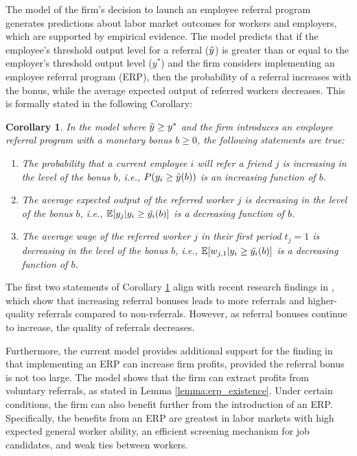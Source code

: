 \documentclass[12pt]{article}
\newtheorem{corollary}[theorem]{Corollary}
\begin{document}
The model of the firm's decision to launch an employee referral program generates predictions about labor market outcomes for workers and employers, which are supported by empirical evidence. The model predicts that if the employee's threshold output level for a referral ($\Tilde{y}$) is greater than or equal to the employer's threshold output level ($y^*$) and the firm considers implementing an employee referral program (ERP),  then the probability of a referral increases with the bonus, while the average expected output of referred workers decreases. This is formally stated in the following Corollary:

\begin{corollary}\label{cor:erp_emp_evidence}
In the model where $\Tilde{y} \geq y^*$ and the firm introduces an employee referral program with a monetary bonus $b \geq 0$, the following statements are true:
\begin{enumerate}[label = {\roman*)}]
\item The probability that a current employee $i$ will refer a friend $j$ is increasing in the level of the bonus $b$, i.e., $P(y_i\geq \Tilde{y}(b))$ is an increasing function of $b$.
\item The average expected output of the referred worker $j$ is decreasing in the level of the bonus $b$, i.e., $\mathbb{E}[y_j|y_i\geq \Tilde{y_i}(b)]$ is a decreasing function of $b$.
\item The average wage of the referred worker $j$ in their first period $t_j = 1$ is decreasing in the level of the bonus $b$, i.e., $\mathbb{E}[w_{j,1}|y_i\geq \Tilde{y_i}(b)]$ is a decreasing function of $b$.
\end{enumerate}
\end{corollary}

The first two statements of Corollary \ref{cor:erp_emp_evidence} align with recent research findings in \cite{friebel2023employee}, which show that increasing referral bonuses leads to more referrals and higher-quality referrals compared to non-referrals. However, as referral bonuses continue to increase, the quality of referrals decreases. 

Furthermore, the current model provides additional support for the finding in \cite{friebel2023employee} that implementing an ERP can increase firm profits, provided the referral bonus is not too large. The model shows that the firm can extract profits from voluntary referrals, as stated in Lemma \ref{lemma:erp_existence}. Under certain conditions, the firm can also benefit further from the introduction of an ERP. Specifically, the benefits from an ERP are greatest in labor markets with high expected general worker ability, an efficient screening mechanism for job candidates, and weak ties between workers.
\end{document}
